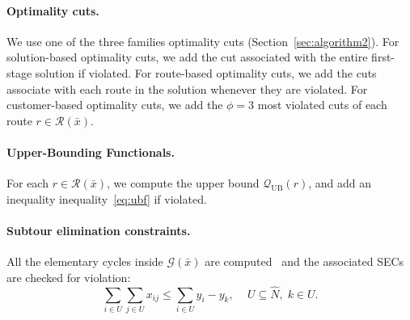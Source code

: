 \documentclass[11pt]{article}
\theoremstyle{definition}
\begin{document}
\paragraph{Optimality cuts.}
We use one of the three families optimality cuts (Section~\ref{sec:algorithm2}). For solution-based optimality cuts, we add the cut associated with the entire first-stage solution if violated. For route-based optimality cuts, we add the cuts associate with each route in the solution whenever they are violated. For customer-based optimality cuts, we add the $\phi = 3$ most violated cuts of each route $r \in \mathcal{R}(\bar{x})$.

\paragraph{Upper-Bounding Functionals.}
For each $r \in \mathcal{R}(\bar{x})$, we compute the upper bound $\mathcal{Q}_{\text{UB}}(r)$, and add an inequality inequality~\eqref{eq:ubf} if violated.

\paragraph{Subtour elimination constraints.}
All the elementary cycles inside $\mathcal{G}(\bar{x})$ are computed~\citep{Hawick2008} and the associated SECs are checked for violation:
%
\begin{equation}
\label{eq:2secs}
\sum_{i \in U} \sum_{j \in U} x_{ij} \leq \sum_{i \in U} y_i - y_k, \quad \, U \subseteq \hat{N},\; k \in U.
\end{equation}
\end{document}
